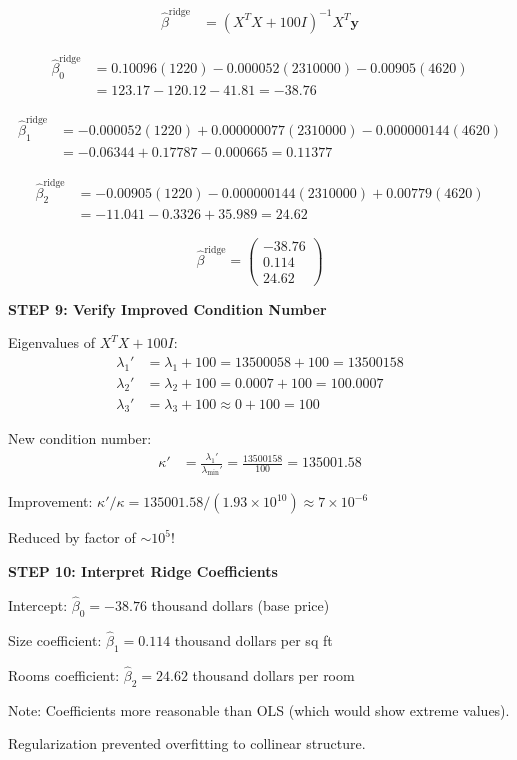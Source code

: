 \documentclass[12pt]{article}
\begin{document}
\begin{solution}
\begin{align*}
\hat{\beta}^{\text{ridge}} &= (X^TX + 100I)^{-1}X^T\mathbf{y}
\end{align*}

\begin{align*}
\hat{\beta}_0^{\text{ridge}} &= 0.10096(1220) - 0.000052(2310000) - 0.00905(4620) \\
&= 123.17 - 120.12 - 41.81 = -38.76
\end{align*}

\begin{align*}
\hat{\beta}_1^{\text{ridge}} &= -0.000052(1220) + 0.000000077(2310000) - 0.000000144(4620) \\
&= -0.06344 + 0.17787 - 0.000665 = 0.11377
\end{align*}

\begin{align*}
\hat{\beta}_2^{\text{ridge}} &= -0.00905(1220) - 0.000000144(2310000) + 0.00779(4620) \\
&= -11.041 - 0.3326 + 35.989 = 24.62
\end{align*}

\[\boxed{\hat{\beta}^{\text{ridge}} = \begin{pmatrix} -38.76 \\ 0.114 \\ 24.62 \end{pmatrix}}\]

\textbf{STEP 9: Verify Improved Condition Number}

Eigenvalues of $X^TX + 100I$:
\begin{align*}
\lambda_1' &= \lambda_1 + 100 = 13500058 + 100 = 13500158 \\
\lambda_2' &= \lambda_2 + 100 = 0.0007 + 100 = 100.0007 \\
\lambda_3' &= \lambda_3 + 100 \approx 0 + 100 = 100
\end{align*}

New condition number:
\begin{align*}
\kappa' &= \frac{\lambda_1'}{\lambda_{\min}'} = \frac{13500158}{100} = 135001.58
\end{align*}

Improvement: $\kappa'/\kappa = 135001.58 / (1.93 \times 10^{10}) \approx 7 \times 10^{-6}$

Reduced by factor of $\sim 10^5$!

\textbf{STEP 10: Interpret Ridge Coefficients}

Intercept: $\hat{\beta}_0 = -38.76$ thousand dollars (base price)

Size coefficient: $\hat{\beta}_1 = 0.114$ thousand dollars per sq ft

Rooms coefficient: $\hat{\beta}_2 = 24.62$ thousand dollars per room

Note: Coefficients more reasonable than OLS (which would show extreme values).

Regularization prevented overfitting to collinear structure.

\end{solution}
\end{document}
